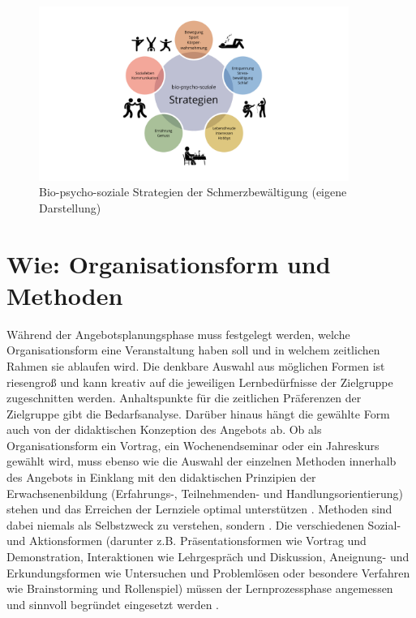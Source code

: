 \documentclass[
  twoside,
  parskip=half-,
  paper=176mm:246mm,
  BCOR=14mm,
  DIV=14,
]{scrreprt}
\begin{document}
\begin{figure}
  \centering
  \includegraphics[width=0.9\textwidth]{Grafiken/Strategien.pdf}
  \caption{Bio-psycho-soziale Strategien der Schmerzbewältigung (eigene Darstellung)}
  \label{fig:biopsychosozial}
\end{figure}

\section{Wie: Organisationsform und Methoden}

Während der Angebotsplanungsphase muss festgelegt werden, welche Organisationsform eine Veranstaltung haben soll und in welchem zeitlichen Rahmen sie ablaufen wird. Die denkbare Auswahl aus möglichen Formen ist riesengroß und kann kreativ auf die jeweiligen Lernbedürfnisse der Zielgruppe zugeschnitten werden. Anhaltspunkte für die zeitlichen Präferenzen der Zielgruppe gibt die Bedarfsanalyse. Darüber hinaus hängt die gewählte Form auch von der didaktischen Konzeption des Angebots ab. Ob als Organisationsform ein Vortrag, ein Wochenendseminar oder ein Jahreskurs gewählt wird, muss ebenso wie die Auswahl der einzelnen Methoden innerhalb des Angebots in Einklang mit den didaktischen Prinzipien der Erwachsenenbildung (Erfahrungs-, Teilnehmenden- und Handlungsorientierung) stehen und das Erreichen der Lernziele optimal unterstützen \autocite[vgl.][1009]{reich-claassen}. Methoden sind dabei niemals als Selbstzweck zu verstehen, sondern . Die verschiedenen Sozial- und Aktionsformen (darunter z.B. Präsentationsformen wie Vortrag und Demonstration, Interaktionen wie Lehrgespräch und Diskussion, Aneignung- und Erkundungsformen wie Untersuchen und Problemlösen oder besondere Verfahren wie Brainstorming und Rollenspiel) müssen der Lernprozessphase angemessen und sinnvoll begründet eingesetzt werden \autocite[vgl.][101]{schlutz}.
\end{document}
